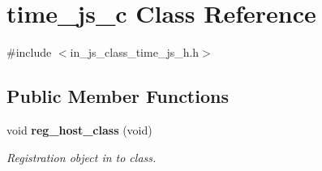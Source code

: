 \section{time\+\_\+js\+\_\+c Class Reference}
\label{classtime__js__c}


{\ttfamily \#include $<$in\+\_\+js\+\_\+class\+\_\+time\+\_\+js\+\_\+h.\+h$>$}

\subsection*{Public Member Functions}
\begin{DoxyCompactItemize}
\item 
void \textbf{ reg\+\_\+host\+\_\+class} (void)
\begin{DoxyCompactList}\small\item\em Registration object in to class. \end{DoxyCompactList}\end{DoxyCompactItemize}
